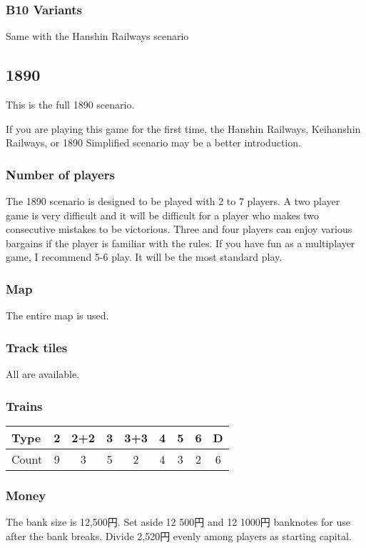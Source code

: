 \begin{multicols}{2}
\subsubsection{B10 Variants}
Same with the Hanshin Railways scenario

\newpage
\subsection{1890}

This is the full 1890 scenario.

If you are playing this game for the first time, the Hanshin Railways,
Keihanshin Railways, or 1890 Simplified scenario may be a better
introduction.

\subsubsection{Number of players}

The 1890 scenario is designed to be played with 2 to 7 players. A two
player game is very difficult and it will be difficult for a player
who makes two consecutive mistakes to be victorious. Three and four
players can enjoy various bargains if the player is familiar with the
rules. If you have fun as a multiplayer game, I recommend 5-6 play. It
will be the most standard play.

\subsubsection{Map}

The entire map is used.

\subsubsection{Track tiles}

All are available.

\subsubsection{Trains}
\begin{tabular}{l|cccccccc}
Type & 2 & 2+2 & 3 & 3+3 & 4 & 5 & 6 & D \\ \hline
Count & 9 & 3 & 5 & 2 & 4 & 3 & 2 & 6
\end{tabular}

\subsubsection{Money}
The bank size is 12,500円. Set aside 12 500円 and 12 1000円
banknotes for use after the bank breaks. Divide 2,520円 evenly
among players as starting capital.


\end{multicols}
